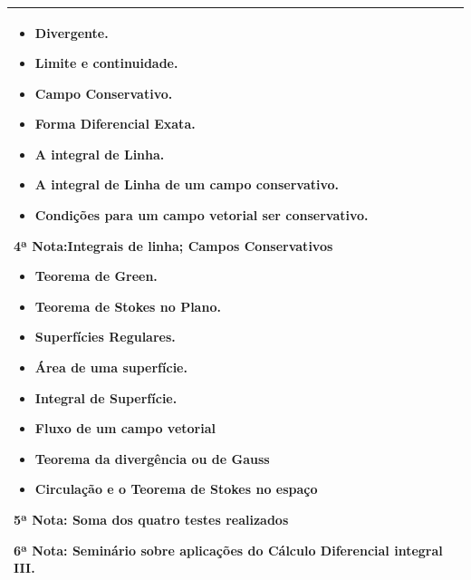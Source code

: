 \documentclass[12pt,a4paper]{article}
\begin{document}
\newpage
\vspace{0.7cm}\hspace{-1.7cm}\begin{tabular}{|p{16.8cm}|}
\hline
\begin{itemize}
  \item Divergente.
  \item Limite e continuidade.
  \item Campo Conservativo.
  \item Forma Diferencial Exata.
  \item A integral de Linha.
  \item A integral de Linha de um campo conservativo.
  \item Condições para um campo vetorial  ser conservativo.
\end{itemize}

4ª Nota:\textbf{Integrais de linha; Campos Conservativos}

\begin{itemize}
  \item Teorema de Green.
  \item Teorema de Stokes no Plano.
  \item  Superfícies Regulares.
  \item Área de uma superfície.
  \item Integral de Superfície.
  \item Fluxo de um campo vetorial
  \item Teorema da divergência ou de Gauss
  \item Circulação e o Teorema de Stokes no espaço
\end{itemize}

5ª Nota: Soma dos quatro testes realizados

6ª Nota: Seminário sobre aplicações do Cálculo Diferencial  integral III.

\\
\hline
\end{tabular}
\newpage
\vspace{0.7cm}\hspace{-1.7cm}
\end{document}
